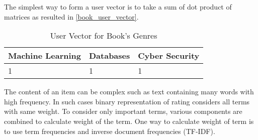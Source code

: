 \noindent The simplest way to form a user vector is to take a sum of dot product of matrices as resulted in \autoref{book_user_vector}.  
\begin{table}[]
\centering
\begin{tabular}{|l|l|l|}
\hline
Machine Learning & Databases & Cyber Security \\ \hline
1                & 1         & 1              \\ \hline
\end{tabular}
\caption{User Vector for Book's Genres}
\label{book_user_vector}
\end{table}

\noindent The content of an item can be complex such as text containing many words with high frequency. In such cases binary representation of rating considers all terms with same weight. To consider only important terms, various components are combined to calculate weight of the term. One way to calculate weight of term is to use term frequencies and inverse document frequencies (TF-IDF). 



